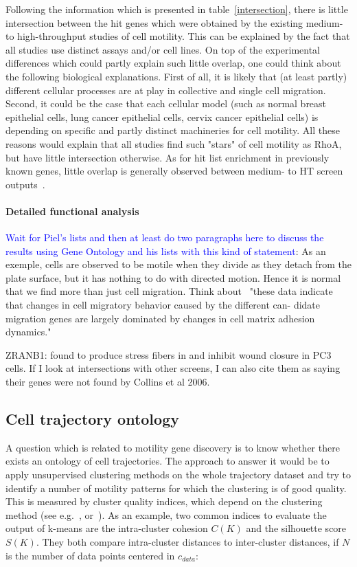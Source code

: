 Following the information which is presented in table~\ref{intersection}, there is little intersection between the hit genes which were obtained by the existing medium- to high-throughput studies of cell motility. This can be explained by the fact that all studies use distinct assays and/or cell lines. On top of the experimental differences which could partly explain such little overlap, one could think about the following biological explanations. First of all, it is likely that (at least partly) different cellular processes are at play in collective and single cell migration. Second, it could be the case that each cellular model (such as normal breast epithelial cells, lung cancer epithelial cells, cervix cancer epithelial cells) is depending on specific and partly distinct machineries for cell motility. All these reasons would explain that all studies find such "stars" of cell motility as RhoA, but have little intersection otherwise. As for hit list enrichment in previously known genes, little overlap is generally observed between medium- to HT screen outputs~\cite{pmid20360735}.

\paragraph{Detailed functional analysis}
\textcolor{blue}{Wait for Piel's lists and then at least do two paragraphs here to discuss the results using Gene Ontology and his lists with this kind of statement}:  As an exemple, cells are observed to be motile when they divide as they detach from the plate surface, but it has nothing to do with directed motion. Hence it is normal that we find more than just cell migration. Think about~\cite{pmid18213366} "these data indicate that changes in cell migratory behavior caused by the different can-
didate migration genes are largely dominated by changes in cell matrix adhesion dynamics."

ZRANB1: found to produce stress fibers in \cite{pmid21834987} and inhibit wound closure in PC3 cells. If I look at intersections with other screens, I can also cite them as saying their genes were not found by Collins et al 2006.

\subsection{Cell trajectory ontology}
\label{sec:ontology}
A question which is related to motility gene discovery is to know whether there exists an ontology of cell trajectories. The approach to answer it would be to apply unsupervised clustering methods on the whole trajectory dataset and try to identify a number of motility patterns for which the clustering is of good quality. This is measured by cluster quality indices, which depend on the clustering method (see e.g.~\cite[Chapter~8]{Tan:2005:IDM:1095618}, or~\cite{Halkidi}). As an example, two common indices to evaluate the output of k-means are the intra-cluster cohesion $C(K)$ and the silhouette score $S(K)$. They both compare intra-cluster distances to inter-cluster distances, if $N$ is the number of data points centered in $c_{data}$:

